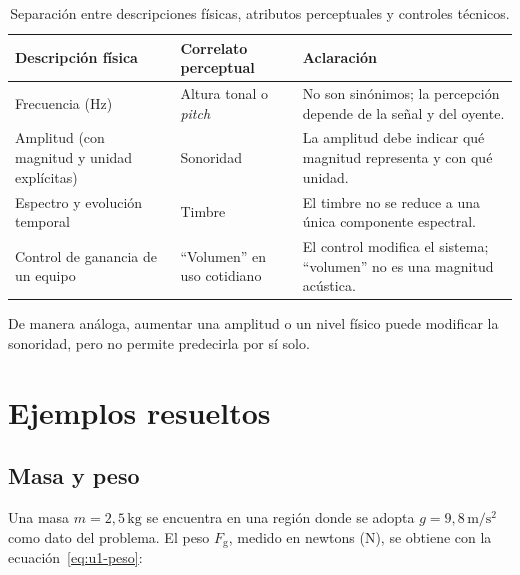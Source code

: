 \begin{table}[htbp]
    \centering
    \setlength{\tabcolsep}{4pt}
    \begin{tabular}{|>{\raggedright\arraybackslash}p{}|>{\raggedright\arraybackslash}p{}|>{\raggedright\arraybackslash}p{}|}
        \hline
        \textbf{Descripción física} & \textbf{Correlato perceptual} & \textbf{Aclaración} \\
        \hline
        Frecuencia (\(\text{Hz}\)) & Altura tonal o \emph{pitch} & No son sinónimos; la percepción depende de la señal y del oyente. \\
        Amplitud (con magnitud y unidad explícitas) & Sonoridad & La amplitud debe indicar qué magnitud representa y con qué unidad. \\
        Espectro y evolución temporal & Timbre & El timbre no se reduce a una única componente espectral. \\
        Control de ganancia de un equipo & ``Volumen'' en uso cotidiano & El control modifica el sistema; ``volumen'' no es una magnitud acústica. \\
        \hline
    \end{tabular}
    \caption{Separación entre descripciones físicas, atributos perceptuales y controles técnicos.}
    \label{tab:u1-fisico-perceptual}
\end{table}

 De manera análoga, aumentar una amplitud o un nivel físico puede modificar la sonoridad, pero no permite predecirla por sí solo.

\section{Ejemplos resueltos}
\label{sec:u1-ejemplos}

\subsection{Masa y peso}
\label{sec:u1-ejemplo-peso}

Una masa \(m=2{,}5\,\text{kg}\) se encuentra en una región donde se adopta \(g=9{,}8\,\text{m}/\text{s}^{2}\) como dato del problema. El peso \(F_\mathrm{g}\), medido en newtons (\(\text{N}\)), se obtiene con la ecuación~\eqref{eq:u1-peso}:

